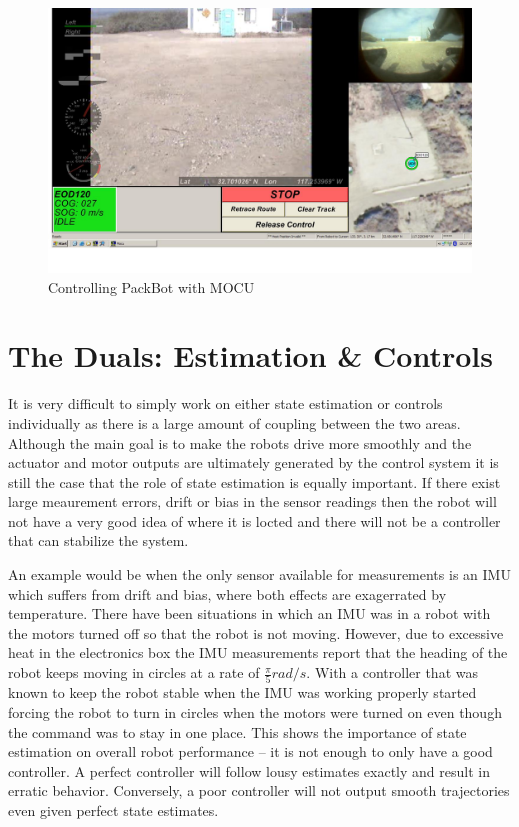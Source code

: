 \begin{figure}[ht!]
	\centering
	\includegraphics[width=.75\textwidth]{images/mocuPackbotScreenshot}
	\caption{Controlling PackBot with MOCU}
	\label{fig:mocu}
\end{figure}

\section{The Duals: Estimation \& Controls}
\label{sec:duals}
It is very difficult to simply work on either state estimation or controls individually as there is a large amount of coupling between the two areas. Although the main goal is to make the robots drive more smoothly and the actuator and motor outputs are ultimately generated by the control system it is still the case that the role of state estimation is equally important. If there exist large meaurement errors, drift or bias in the sensor readings then the robot will not have a very good idea of where it is locted and there will not be a controller that can stabilize the system.

An example would be when the only sensor available for measurements is an IMU which suffers from drift and bias, where both effects are exagerrated by temperature. There have been situations in which an IMU was in a robot with the motors turned off so that the robot is not moving. However, due to excessive heat in the electronics box the IMU measurements report that the heading of the robot keeps moving in circles at a rate of $\frac{\pi}{5} rad/s$. With a controller that was known to keep the robot stable when the IMU was working properly started forcing the robot to turn in circles when the motors were turned on even though the command was to stay in one place. This shows the importance of state estimation on overall robot performance -- it is not enough to only have a good controller. A perfect controller will follow lousy estimates exactly and result in erratic behavior. Conversely, a poor controller will not output smooth trajectories even given perfect state estimates.

